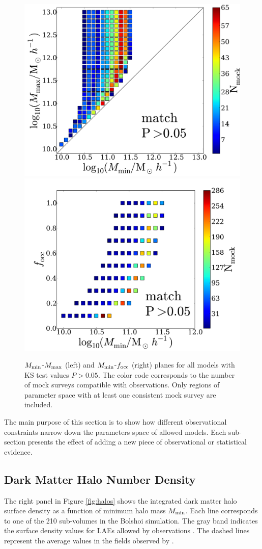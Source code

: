 \documentclass[usenatbib]{mn2e}
\begin{document}
\begin{figure}
\begin{center}
\includegraphics[width=0.46\linewidth,angle=0]{Fig2_match_P5.pdf}
\vspace{5mm}
\includegraphics[width=0.49\linewidth,angle=0]{Fig3_match_P5.pdf}
\end{center} 
\caption{$M_{\rm min}$-$M_{\rm max}$ (left) and $M_{\rm    min}$-$f_{\rm
    occ}$ (right) planes for all models with  KS test values
  $P>0.05$. The color code corresponds to the number of mock surveys
  compatible with observations. Only regions of parameter  space with
  at least one consistent mock survey are
  included. \label{fig:landscape}}      
\end{figure} 

The main purpose of this section is to show how different
observational constraints narrow down the parameters space of allowed
models. Each sub-section presents the effect of adding a new piece of 
observational or statistical evidence. 


\subsection{Dark Matter Halo Number Density}

The right panel in Figure \ref{fig:halos} shows the  integrated dark matter halo surface
density as a function of  minimum halo mass $M_{\rm min}$. Each line
corresponds to one of the 210 sub-volumes in the Bolshoi
simulation. The gray band indicates the surface density values for
LAEs allowed by observations \citep{Yamada2012}. The dashed lines
represent the average values in the fields observed by
\citep{Hayashino2004,Ouchi08}. 
 
\end{document}
